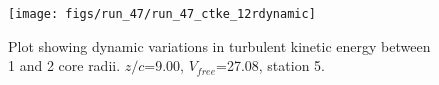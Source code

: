 \begin{figure}[H]
\centering
\texttt{[image: figs/run\_47/run\_47\_ctke\_12rdynamic]}
\caption{Plot showing dynamic variations in turbulent kinetic energy between 1 and 2 core radii. $z/c$=9.00, $V_{free}$=27.08, station 5.}
\label{fig:run_47_ctke_12rdynamic}
\end{figure}


